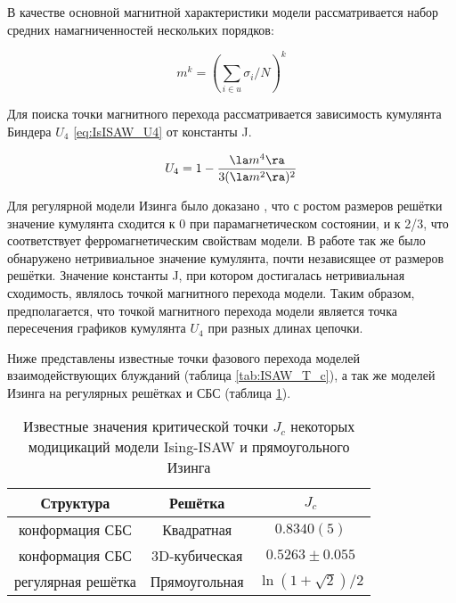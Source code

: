 В качестве основной магнитной характеристики модели рассматривается набор средних намагниченностей нескольких порядков:

\begin{equation}
\label{eq:IsISAW_m2}
	m^{k} = (\sum_{i \in u} \sigma_i / N)^k
\end{equation} 

Для поиска точки магнитного перехода рассматривается зависимость кумулянта Биндера $U_4$ \eqref{eq:IsISAW_U4} от константы J.

\begin{equation}
\label{eq:IsISAW_U4}
	U_4 = 1 - \frac{\la m^4 \ra}{3 (\la m^2 \ra)^2}
\end{equation}

Для регулярной модели Изинга было доказано \cite{Binder1981_Ising}, 
что с ростом размеров решётки значение кумулянта сходится к 0 при парамагнетическом состоянии, 
и к 2/3, что соответствует ферромагнетическим свойствам модели.
В работе \cite{Binder1981_Ising} так же было обнаружено нетривиальное значение кумулянта, почти независящее от размеров решётки.
Значение константы J, при котором достигалась нетривиальная сходимость, являлось точкой магнитного перехода модели.
Таким образом, предполагается, что точкой магнитного перехода модели является 
точка пересечения графиков кумулянта $U_4$ при разных длинах цепочки.

Ниже представлены известные точки фазового перехода моделей взаимодействующих блужданий (таблица \ref{tab:ISAW_T_c}), 
а так же моделей Изинга на регулярных решётках и СБС (таблица \ref{tab:Ising_T_c}).


\begin{table}[h]
    \centering
    \begin{tabular}{|c|c|c|}
        \hline
        Структура & Решётка & $J_{c}$ \\ \hline
        конформация СБС & Квадратная & $0.8340(5)$\cite{faizullina2021critical} \\ \hline
        конформация СБС & 3D-кубическая & $0.5263 \pm 0.055$\cite{foster2021critical}\\ \hline
        регулярная решётка & Прямоугольная & $\ln{(1 + \sqrt{2}) / 2}$\cite{Onsager}\\ \hline
    \end{tabular}
    \caption{Известные значения критической точки $J_c$ некоторых модицикаций модели Ising-ISAW и прямоугольного Изинга}
    \label{tab:Ising_T_c}
\end{table}

